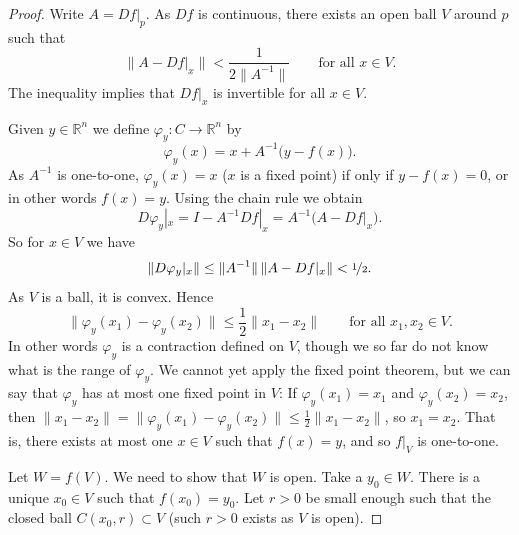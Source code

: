 \documentclass[12pt,openany]{book}
\newcommand{\snorm}[1]{\lVert {#1} \rVert}
\newcommand{\R}{{\mathbb{R}}}
\theoremstyle{plain}
\theoremstyle{remark}
\theoremstyle{definition}
\theoremstyle{exercise}
\theoremstyle{example}
\newcommand{\propref}[1]{\hyperref[#1]{Proposition~\ref*{#1}}}
\begin{document}
\begin{proof}
Write $A = Df|_p$.  As $Df$ is continuous, there exists an open ball
$V$ around $p$ such that
\begin{equation*}
\snorm{A-Df|_x} < \frac{1}{2\snorm{A^{-1}}}
\qquad \text{for all } x \in V.
\end{equation*}
The inequality implies that $Df|_x$ is invertible for all $x \in V$.

Given $y \in \R^n$ we define $\varphi_y \colon C \to \R^n$ by
\begin{equation*}
\varphi_y (x) = x + A^{-1}\bigl(y-f(x)\bigr) .
\end{equation*}
As $A^{-1}$ is one-to-one,
$\varphi_y(x) = x$ ($x$ is a fixed point) if only if
$y-f(x) = 0$, or in other words $f(x)=y$.  Using the chain rule we obtain
\begin{equation*}
D\varphi_y|_x = I - A^{-1} Df|_x = A^{-1} \bigl( A-Df|_x \bigr) .
\end{equation*}
So for $x \in V$ we have
\begin{equation*}
\snorm{D\varphi_y|_x} \leq \snorm{A^{-1}} \, \snorm{A-Df|_x} < \nicefrac{1}{2} .
\end{equation*}
As $V$ is a ball, it is convex.  Hence
\begin{equation*}
\snorm{\varphi_y(x_1)-\varphi_y(x_2)} \leq \frac{1}{2} \snorm{x_1-x_2} 
\qquad
\text{for all } x_1,x_2 \in V.
\end{equation*}
In other words $\varphi_y$ is a contraction defined on $V$, though we so far
do not know what is the range of $\varphi_y$.  We cannot yet
apply the fixed
point theorem, but we can say that $\varphi_y$ 
has at most one fixed point in $V$:
If $\varphi_y(x_1) = x_1$ and
$\varphi_y(x_2) = x_2$, then
$\snorm{x_1-x_2} = \snorm{\varphi_y(x_1)-\varphi_y(x_2)} \leq
\frac{1}{2} \snorm{x_1-x_2}$, so $x_1 = x_2$.
That is, there exists at most one $x \in V$
such that $f(x) = y$, and so $f|_V$ is one-to-one.

Let $W = f(V)$.  We need to show that $W$ is open.  Take a $y_0 \in W$.
There is a unique $x_0 \in V$ such that $f(x_0) = y_0$.
Let $r > 0$ be small enough such that the closed ball $C(x_0,r) \subset V$
(such $r > 0$ exists as $V$ is open).


\end{proof}
\end{document}
